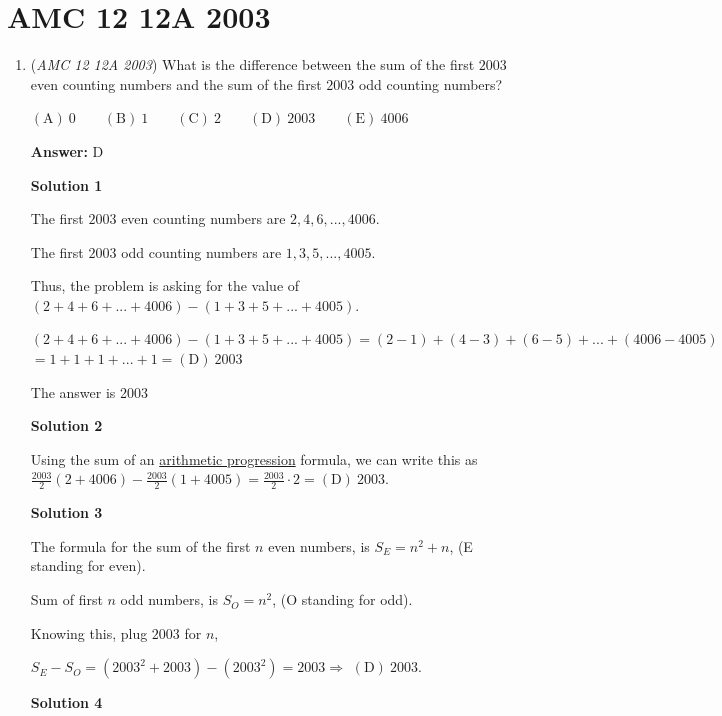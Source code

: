 \section{AMC 12 12A 2003}
        \begin{enumerate}
        	\item (\textit{AMC 12 12A 2003}) What is the difference between the sum of the first $2003$ even counting numbers and the sum of the first $2003$ odd counting numbers? 


 $\mathrm{(A) \ } 0\qquad \mathrm{(B) \ } 1\qquad \mathrm{(C) \ } 2\qquad \mathrm{(D) \ } 2003\qquad \mathrm{(E) \ } 4006$

 \textbf{Answer: }D



\textbf{Solution 1}

The first $2003$ even counting numbers are $2,4,6,...,4006$. 

 The first $2003$ odd counting numbers are $1,3,5,...,4005$. 

 Thus, the problem is asking for the value of $(2+4+6+...+4006)-(1+3+5+...+4005)$. 

 $(2+4+6+...+4006)-(1+3+5+...+4005) = (2-1)+(4-3)+(6-5)+...+(4006-4005)$
$= 1+1+1+...+1 = \boxed{\mathrm{(D)}\ 2003}$

 The answer is 2003

 



\textbf{Solution 2}

Using the sum of an \href{https://artofproblemsolving.com/wiki/index.php?title=Arithmetic\_progression}{arithmetic progression} formula, we can write this as $\frac{2003}{2}(2 + 4006) - \frac{2003}{2}(1 + 4005) = \frac{2003}{2} \cdot 2 = \boxed{\mathrm{(D)}\ 2003}$.

 


 



\textbf{Solution 3}

The formula for the sum of the first $n$ even numbers, is $S_E=n^{2}+n$, (E standing for even).

 Sum of first $n$ odd numbers, is $S_O=n^{2}$, (O standing for odd).

 Knowing this, plug $2003$ for $n$, 

 $S_E-S_O= (2003^{2}+2003)-(2003^{2})=2003 \Rightarrow$ $\boxed{\mathrm{(D)}\ 2003}$.

 



\textbf{Solution 4}


\end{enumerate}
